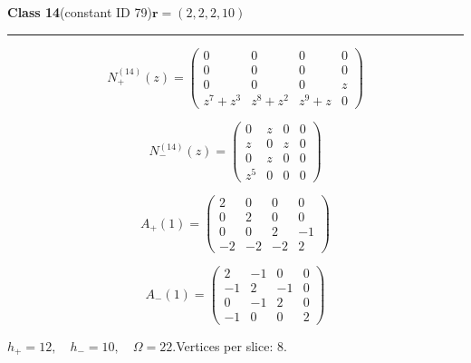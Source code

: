 \noindent\begin{minipage}{\linewidth}
\noindent\textbf{Class 14}\quad\small (constant ID 79)\hfill $\symbf{r}=(2,2,2,10)$
\par\smallskip\noindent\textcolor{rulegray}{\rule{\linewidth}{0.3pt}}
\begin{minipage}[c]{0.495\linewidth}\centering\fontsize{9.7}{12}\selectfont
\setlength{\abovedisplayskip}{4pt}\setlength{\belowdisplayskip}{4pt}
\setlength{\abovedisplayshortskip}{4pt}\setlength{\belowdisplayshortskip}{4pt}
\setlength{\arraycolsep}{3pt}\renewcommand{\arraystretch}{1.08}
\[N_{+}^{(14)}(z)=\begin{pmatrix}0 & 0 & 0 & 0\\0 & 0 & 0 & 0\\0 & 0 & 0 & z\\z^{7} + z^{3} & z^{8} + z^{2} & z^{9} + z & 0\end{pmatrix}\]
\end{minipage}%
\begin{minipage}[c]{0.495\linewidth}\centering\fontsize{9.7}{12}\selectfont
\setlength{\abovedisplayskip}{4pt}\setlength{\belowdisplayskip}{4pt}
\setlength{\abovedisplayshortskip}{4pt}\setlength{\belowdisplayshortskip}{4pt}
\setlength{\arraycolsep}{3pt}\renewcommand{\arraystretch}{1.08}
\[N_{-}^{(14)}(z)=\begin{pmatrix}0 & z & 0 & 0\\z & 0 & z & 0\\0 & z & 0 & 0\\z^{5} & 0 & 0 & 0\end{pmatrix}\]
\end{minipage}%
\par\noindent
\begin{minipage}[c]{0.495\linewidth}\centering\fontsize{9.7}{12}\selectfont
\setlength{\abovedisplayskip}{4pt}\setlength{\belowdisplayskip}{4pt}
\setlength{\abovedisplayshortskip}{4pt}\setlength{\belowdisplayshortskip}{4pt}
\setlength{\arraycolsep}{3pt}\renewcommand{\arraystretch}{1.08}
\[A_{+}(1)=\begin{pmatrix}2 & 0 & 0 & 0\\0 & 2 & 0 & 0\\0 & 0 & 2 & -1\\-2 & -2 & -2 & 2\end{pmatrix}\]
\end{minipage}%
\begin{minipage}[c]{0.495\linewidth}\centering\fontsize{9.7}{12}\selectfont
\setlength{\abovedisplayskip}{4pt}\setlength{\belowdisplayskip}{4pt}
\setlength{\abovedisplayshortskip}{4pt}\setlength{\belowdisplayshortskip}{4pt}
\setlength{\arraycolsep}{3pt}\renewcommand{\arraystretch}{1.08}
\[A_{-}(1)=\begin{pmatrix}2 & -1 & 0 & 0\\-1 & 2 & -1 & 0\\0 & -1 & 2 & 0\\-1 & 0 & 0 & 2\end{pmatrix}\]
\end{minipage}%
\par\smallskip\noindent\small $h_+=12,\quad h_-=10,\quad \Omega=22.$\quad Vertices per slice: 8.
\end{minipage}\par\vfill
\clearpage
